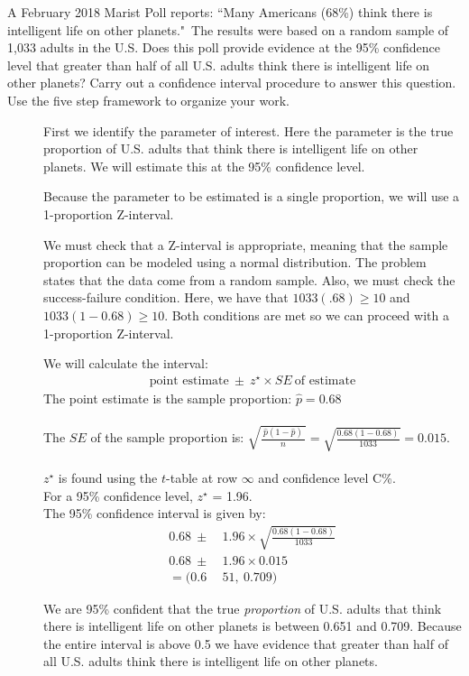 \begin{examplewrap}
\begin{nexample}
{A February 2018 Marist Poll reports:  ``Many Americans (68\%) think there is intelligent life on other planets."\footnotemark\,  The results were based on a random sample of 1,033 adults in the U.S.  Does this poll provide evidence at the 95\% confidence level that greater than half of all U.S. adults think there is intelligent life on other planets?  Carry out a confidence interval procedure to answer this question.  Use the five step framework to organize your work.  
}
\label{IntelligentLife}
\begin{description}
\item[] First we identify the parameter of interest.  Here the parameter is the true proportion of U.S. adults that think there is intelligent life on other planets.  We will estimate this at the 95\% confidence level.  
\item[] Because the parameter to be estimated is a single proportion, we will use a 1-proportion Z-interval.
\item[] We must check that a Z-interval is appropriate, meaning that the sample proportion can be modeled using a normal distribution.  The problem states that the data come from a random sample.  Also, we must check the success-failure condition.  Here, we have that $1033(.68)\ge 10$ and $1033(1-0.68)\ge 10$.  Both conditions are met so we can proceed with a 1-proportion Z-interval.
\item[]  We will calculate the interval:
\begin{align*}
 \text{point estimate}\ \pm\ z^{\star} \times SE\ \text{of estimate}
\end{align*}
The point estimate is the sample proportion:  $\hat{p} = 0.68$\\
\\ 
The $SE$ of the sample proportion is:  $\sqrt{\frac{\ \hat{p}(1-\hat{p})\ }{n}} = \sqrt{\frac{0.68(1-0.68)}{1033}}=0.015$.\\
\\
$z^{\star}$ is found using the $t$-table at row $\infty$ and confidence level C\%.  \\
For a 95\% confidence level, $z^{\star}$ = 1.96. \\

The 95\% confidence interval is given by:
\begin{align*}
0.68\ \pm\  &1.96 \times \sqrt{\frac{0.68(1-0.68)}{1033}} \\
0.68\ \pm\  &1.96 \times 0.015 \\
 = (0.6&51,\  0.709)
\end{align*}
\item[]  We are 95\%  confident that the true \emph{proportion} of U.S. adults that think there is intelligent life on other planets is between 0.651 and 0.709. Because the entire interval is above 0.5 we have evidence that greater than half of all U.S. adults think there is intelligent life on other planets.
\end{description}
\end{nexample}
\end{examplewrap}

